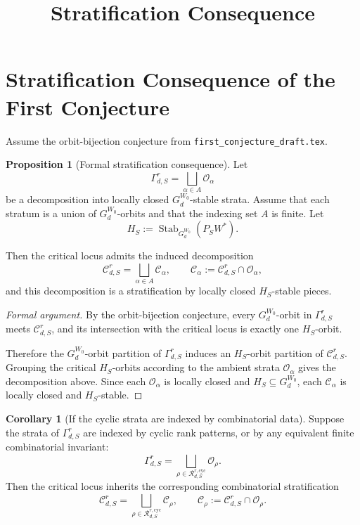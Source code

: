 \documentclass{article}
\title{Stratification Consequence}
\date{}
\newcommand{\Stab}{\operatorname{Stab}}
\theoremstyle{definition}
\newtheorem{proposition}[theorem]{Proposition}
\newtheorem{corollary}[theorem]{Corollary}
\begin{document}
\maketitle

\section{Stratification Consequence of the First Conjecture}

Assume the orbit-bijection conjecture from \texttt{first\_conjecture\_draft.tex}.

\begin{proposition}[Formal stratification consequence]
Let
\[
\Gamma_{d,S}^r
=
\bigsqcup_{\alpha\in A}\mathcal O_\alpha
\]
be a decomposition into locally closed $G_d^{W_0}$-stable strata. Assume that each stratum is a union of $G_d^{W_0}$-orbits and that the indexing set $A$ is finite. Let
\[
H_S:=\Stab_{G_d^{W_0}}(P_SW^\ast).
\]

Then the critical locus admits the induced decomposition
\[
\mathcal C_{d,S}^r
=
\bigsqcup_{\alpha\in A}\mathcal C_\alpha,
\qquad
\mathcal C_\alpha := \mathcal C_{d,S}^r \cap \mathcal O_\alpha,
\]
and this decomposition is a stratification by locally closed $H_S$-stable pieces.
\end{proposition}

\begin{proof}[Formal argument]
By the orbit-bijection conjecture, every $G_d^{W_0}$-orbit in $\Gamma_{d,S}^r$ meets $\mathcal C_{d,S}^r$, and its intersection with the critical locus is exactly one $H_S$-orbit.

Therefore the $G_d^{W_0}$-orbit partition of $\Gamma_{d,S}^r$ induces an
$H_S$-orbit partition of $\mathcal C_{d,S}^r$. Grouping the critical
$H_S$-orbits according to the ambient strata $\mathcal O_\alpha$ gives the
decomposition above. Since each $\mathcal O_\alpha$ is locally closed and
$H_S\subseteq G_d^{W_0}$, each $\mathcal C_\alpha$ is locally closed and
$H_S$-stable.
\end{proof}

\begin{corollary}[If the cyclic strata are indexed by combinatorial data]
Suppose the strata of $\Gamma_{d,S}^r$ are indexed by cyclic rank patterns, or by any equivalent finite combinatorial invariant:
\[
\Gamma_{d,S}^r
=
\bigsqcup_{\rho\in \mathcal R_{d,S}^{r,\mathrm{cyc}}}\mathcal O_\rho.
\]
Then the critical locus inherits the corresponding combinatorial stratification
\[
\mathcal C_{d,S}^r
=
\bigsqcup_{\rho\in \mathcal R_{d,S}^{r,\mathrm{cyc}}}\mathcal C_\rho,
\qquad
\mathcal C_\rho := \mathcal C_{d,S}^r \cap \mathcal O_\rho.
\]
\end{corollary}
\end{document}
